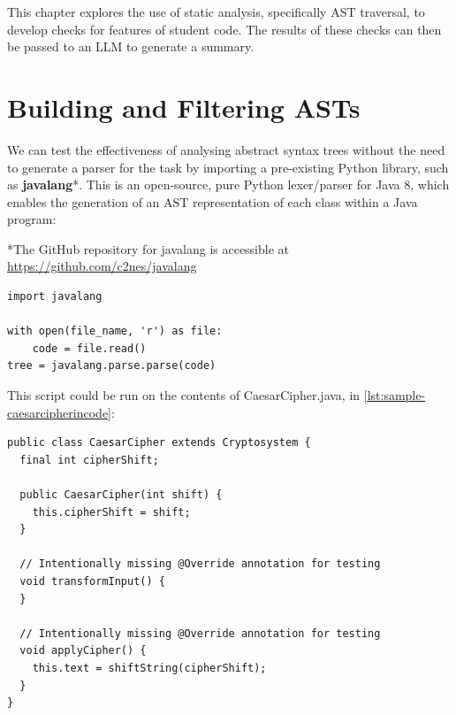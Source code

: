 \label{chapter:part2}
This chapter explores the use of static analysis, specifically AST traversal, to develop checks for features of student code. The results of these checks can then be passed to an LLM to generate a summary.

\section{Building and Filtering ASTs}

We can test the effectiveness of analysing abstract syntax trees without the need to generate a parser for the task by importing a pre-existing Python library, such as \textbf{javalang}*. This is an open-source, pure Python lexer/parser for Java 8, which enables the generation of an AST representation of each class within a Java program:

\footnotesize
*The GitHub repository for javalang is accessible at \url{https://github.com/c2nes/javalang}
\normalsize 

\begin{listing}[H]
\begin{verbatim}
import javalang

with open(file_name, 'r') as file:
    code = file.read()
tree = javalang.parse.parse(code)
\end{verbatim}
\caption{Simple Python script to generate an AST from a given file\_name}
\label{lst:python-asttest}
\end{listing}

This script could be run on the contents of CaesarCipher.java, in \cref{lst:sample-caesarcipherincode}:

\begin{listing}[H]
\begin{verbatim}
public class CaesarCipher extends Cryptosystem {
  final int cipherShift;

  public CaesarCipher(int shift) {
    this.cipherShift = shift;
  }

  // Intentionally missing @Override annotation for testing
  void transformInput() {
  }

  // Intentionally missing @Override annotation for testing
  void applyCipher() {
    this.text = shiftString(cipherShift);
  }
}
\end{verbatim}
\caption{CaesarCipher.java}
\label{lst:sample-caesarcipherincode}
\end{listing}

